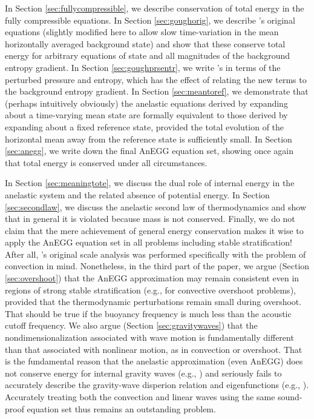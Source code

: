 \documentclass[12pt]{article}
\begin{document}
	In Section \ref{sec:fullycompressible}, we describe conservation of total energy in the fully compressible equations. In Section \ref{sec:goughorig}, we describe \citet{Gough1969}'s original equations (slightly modified here to allow slow time-variation in the mean horizontally averaged background state) and show that these conserve total energy for arbitrary equations of state and all magnitudes of the background entropy gradient. In Section \ref{sec:goughprsentr}, we write \citet{Gough1969}'s in terms of the perturbed pressure and entropy, which has the effect of relating the new terms to the background entropy gradient. In Section \ref{sec:meantoref}, we demonstrate that (perhaps intuitively obviously) the anelastic equations derived by expanding about a time-varying mean state are formally equivalent to those derived by expanding about a fixed reference state, provided the total evolution of the horizontal mean away from the reference state is sufficiently small. In Section \eqref{sec:anegg}, we write down the final AnEGG equation set, showing once again that total energy is conserved under all circumstances. 
	
	In Section \ref{sec:meaningtote}, we discuss the dual role of internal energy in the anelastic system and the related absence of potential energy. In Section \ref{sec:secondlaw}, we discuss the anelastic second law of thermodynamics and show that in general it is violated because mass is not conserved. Finally, we do not claim that the mere achievement of general energy conservation makes it wise to apply the AnEGG equation set in all problems including stable stratification! After all, \citet{Gough1969}'s original scale analysis was performed specifically with the problem of convection in mind. Nonetheless, in the third part of the paper, we argue (Section \ref{sec:overshoot}) that the AnEGG approximation may remain consistent even in regions of strong stable stratification (e.g., for convective overshoot problems), provided that the thermodynamic perturbations remain small during overshoot. That should be true if the buoyancy frequency is much less than the acoustic cutoff frequency. We also argue (Section \ref{sec:gravitywaves}) that the nondimensionalization associated with wave motion is fundamentally different than that associated with nonlinear motion, as in convection or overshoot. That is the fundamental reason that the anelastic approximation (even AnEGG) does not conserve energy for internal gravity waves (e.g., \citealt{Brown2012,Vasil2013}) and seriously fails to accurately describe the gravity-wave disperion relation and eigenfunctions (e.g., \citealt{Hindman2024}). Accurately treating both the convection and linear waves using the same sound-proof equation set thus remains an outstanding problem. %
	
\end{document}
